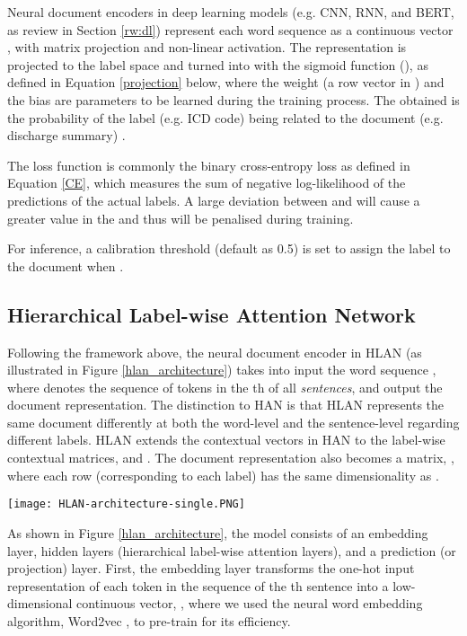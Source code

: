 \documentclass[final,5p,times,twocolumn]{elsarticle}
\begin{document}
Neural document encoders in deep learning models (e.g. CNN, RNN, and BERT, as review in Section \ref{rw:dl}) represent each word sequence  as a continuous vector , with matrix projection and non-linear activation. The representation  is projected to the label space and turned into  with the sigmoid function (), as defined in Equation \ref{projection} below, where the weight  (a row vector in ) and the bias  are parameters to be learned during the training process. The obtained  is the probability of the label (e.g. ICD code)  being related to the document (e.g. discharge summary) .


The loss function is commonly the binary cross-entropy loss \cite{Nam2014} as defined in Equation \ref{CE}, which measures the sum of negative log-likelihood of the predictions  of the actual labels. A large deviation between  and  will cause a greater value in the  and thus will be penalised during training.


For inference, a calibration threshold  (default as 0.5) is set to assign the label to the document when .

\subsection{Hierarchical Label-wise Attention Network}
\label{hlan}
Following the framework above, the neural document encoder in HLAN (as illustrated in Figure \ref{hlan_architecture}) takes into input the word sequence , where  denotes the sequence of tokens in the th of all  \textit{sentences}, and output the document representation. The distinction to HAN \cite{yang2016} is that HLAN represents the same document differently at both the word-level and the sentence-level regarding different labels. HLAN extends the contextual vectors in HAN to the label-wise contextual matrices,  and . The document representation also becomes a matrix, , where each row (corresponding to each label) has the same dimensionality as .

\begin{figure*}[h]
  \center
  \texttt{[image: HLAN-architecture-single.PNG]}
  \caption{Hierarchical Label-wise Attention Network (HLAN)}\label{hlan_architecture}
\end{figure*}

As shown in Figure \ref{hlan_architecture}, the model consists of an embedding layer, hidden layers (hierarchical label-wise attention layers), and a prediction (or projection) layer. First, the embedding layer transforms the one-hot input representation  of each token in the sequence of the th sentence  into a low-dimensional continuous vector, , where we used the neural word embedding algorithm, Word2vec \cite{mikolov2013distributed}, to pre-train  for its efficiency.
\end{document}
